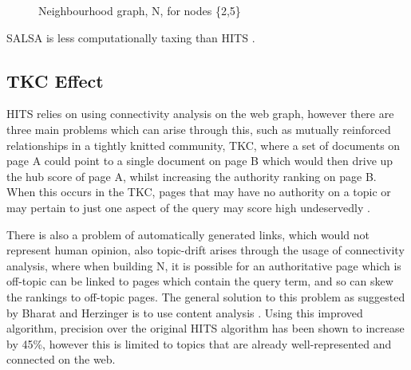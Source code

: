 \documentclass[11pt]{report}
\begin{document}
{\begin{figure}[h] 
\centering
{} \qquad\qquad
{}
\caption{Neighbourhood graph, N,  for nodes \{2,5\} } \label{fig:N build}
\end{figure}

SALSA is less computationally taxing than HITS \cite{lempel2000stochastic}. 
\subsection{TKC Effect}

HITS relies on using connectivity analysis on the web graph, however there are three main problems which can arise through this, such as mutually reinforced relationships in a tightly knitted community, TKC, where a set of documents on page A could point to a single document on page B which would then drive up the hub score of page A, whilst increasing the authority ranking on page B. When this occurs in the TKC, pages that may have no authority on a topic or may pertain to just one aspect of the query may score high undeservedly \cite{lempel2000stochastic}. 

There is also a problem of automatically generated links, which would not represent human opinion, also topic-drift arises through the usage of connectivity analysis, where when building N, it is possible for an authoritative page which is off-topic can be linked to pages which contain the query term, and so can skew the rankings to off-topic pages. The general solution to this problem as suggested by Bharat and Herzinger is to use content analysis \cite{bharat1998improved}. Using this improved algorithm, precision over the original HITS algorithm has been shown to increase by 45\%, however this is limited to topics that are already well-represented and connected on the web. 

}
\end{document}
